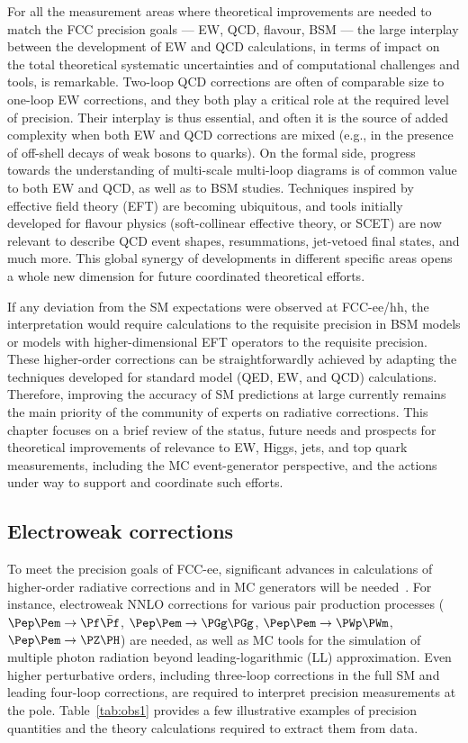 For all the measurement areas where theoretical improvements are needed to match the FCC precision goals --- EW, QCD, flavour, BSM --- 
the large interplay between the development of EW and QCD calculations, 
in terms of impact on the total theoretical systematic uncertainties and of computational challenges and tools, is remarkable.
Two-loop QCD corrections are often of comparable size to one-loop EW corrections, 
and they both play a critical role at the required level of precision. 
Their interplay is thus essential, and often it is the source of added complexity when both EW and QCD corrections are mixed 
(e.g., in the presence of off-shell decays of weak bosons to quarks). 
On the formal side, progress towards the understanding of multi-scale multi-loop diagrams is of common value to both EW and QCD, as well as to BSM studies. 
Techniques inspired by effective field theory (EFT) are becoming ubiquitous, 
and tools initially developed for flavour physics (soft-collinear effective theory, or SCET) 
are now relevant to describe QCD event shapes, resummations, jet-vetoed final states, and much more. 
This global synergy of developments in different specific areas opens a whole new dimension for future coordinated theoretical efforts. 

If any deviation from the SM expectations were observed at FCC-ee/hh, 
the interpretation would require calculations to the requisite precision in BSM models 
or models with higher-dimensional EFT operators to the requisite precision.
These higher-order corrections can be straightforwardly achieved by adapting 
the techniques developed for standard model (QED, EW, and QCD) calculations. 
Therefore, improving the accuracy of SM predictions at large currently remains the main priority of the community of experts on radiative corrections. 
This chapter focuses on a brief review of the status, future needs and prospects for theoretical improvements of relevance to EW, Higgs, jets, and top quark measurements, 
including the MC event-generator perspective, and the actions under way to support and coordinate such efforts.

\subsection{Electroweak corrections}
\label{sec:theocalc}

To meet the precision goals of FCC-ee, 
significant advances in calculations of higher-order radiative corrections and in MC generators will be needed~\cite{Freitas:2019bre,Blondel:2018mad,EWPrecisionWshop}. 
For instance, electroweak NNLO corrections for various pair production processes 
($\epem \to \Pf\bar{\Pf}$, $\epem \to \PGg\PGg$, $\epem \to \PWp\PWm$, $\epem \to \PZ\PH$) 
are needed, as well as MC tools for the simulation of multiple photon radiation beyond leading-logarithmic (LL) approximation. 
Even higher perturbative orders, including three-loop corrections in the full SM and leading four-loop corrections, 
are required to interpret precision measurements at the \PZ pole.
Table~\ref{tab:obs1} provides a few illustrative examples of precision quantities and the theory calculations required to extract them from data.

